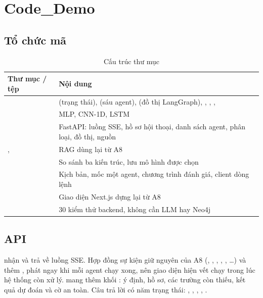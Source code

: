 \documentclass[11pt,a4paper]{article}
\begin{document}
\section{Code\_Demo}
\label{sec:demo}

\subsection{Tổ chức mã}

\begin{table}[H]
\centering
\caption{Cấu trúc thư mục }
\begin{tabularx}{\linewidth}{L{4.6cm}Y}
\toprule
Thư mục / tệp & Nội dung \\
\midrule
{} &  (trạng thái),  (sáu agent),  (đồ thị LangGraph), , , ,  \\
 & MLP, CNN-1D, LSTM \\
 & FastAPI: luồng SSE, hồ sơ hội thoại, danh sách agent, phân loại, đồ thị, nguồn \\
,  & RAG dùng lại từ A8 \\
 & So sánh ba kiến trúc, lưu mô hình được chọn \\
 & Kịch bản, mốc một agent, chương trình đánh giá, client dòng lệnh \\
 & Giao diện Next.js dựng lại từ A8 \\
 & 30 kiểm thử backend, không cần LLM hay Neo4j \\
\bottomrule
\end{tabularx}
\end{table}

\subsection{API}

 nhận  và trả về luồng SSE. Hợp đồng sự kiện giữ nguyên
của A8 (, , , , , \dots)
và thêm , phát ngay khi mỗi agent chạy xong, nên giao diện hiện vết chạy trong lúc hệ thống còn xử lý.
 mang thêm khối : ý định, hồ sơ, các trường còn thiếu, kết quả dự đoán và cờ an toàn. Câu trả
lời có năm trạng thái: , , , , .
\end{document}
